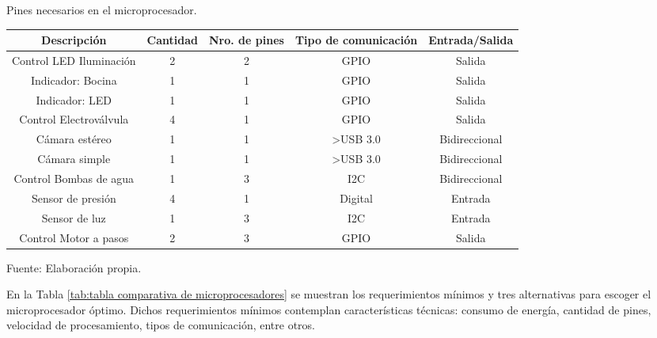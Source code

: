 
\begin{mytable}[H]
	\footnotesize\centering
	\caption{Pines necesarios en el microprocesador.}
	\label{tab:pines necesarios en el microprocesador}
	\begin{tabular}{|c|c|c|c|c|}
		\hline
		\textbf{Descripción} & \textbf{Cantidad} & \textbf{Nro. de pines} & \textbf{Tipo de comunicación} & \textbf{Entrada/Salida} \\ \hline
		Control LED Iluminación   & 2 & 2 & GPIO                  & Salida        \\ \hline
		Indicador: Bocina         & 1 & 1 & GPIO                  & Salida        \\ \hline
		Indicador: LED            & 1 & 1 & GPIO                  & Salida        \\ \hline
		Control Electroválvula    & 4 & 1 & GPIO                  & Salida        \\ \hline
		Cámara estéreo            & 1 & 1 & \textgreater{}USB 3.0 & Bidireccional \\ \hline
		Cámara simple             & 1 & 1 & \textgreater{}USB 3.0 & Bidireccional \\ \hline
		Control Bombas de agua    & 1 & 3 & I2C                   & Bidireccional \\ \hline
		Sensor de presión         & 4 & 1 & Digital               & Entrada       \\ \hline
		Sensor de luz     & 1 & 3 & I2C                   & Entrada        \\ \hline
		Control Motor a pasos     & 2 & 3 & GPIO                  & Salida        \\ \hline
	\end{tabular}
	\begin{myflushcenteraftertable}	
		Fuente: Elaboración propia.
	\end{myflushcenteraftertable}
\end{mytable}

En la Tabla \ref{tab:tabla comparativa de microprocesadores} se muestran los requerimientos mínimos y tres alternativas para escoger el microprocesador óptimo. Dichos requerimientos mínimos contemplan características técnicas: consumo de energía, cantidad de pines, velocidad de procesamiento, tipos de comunicación, entre otros.


